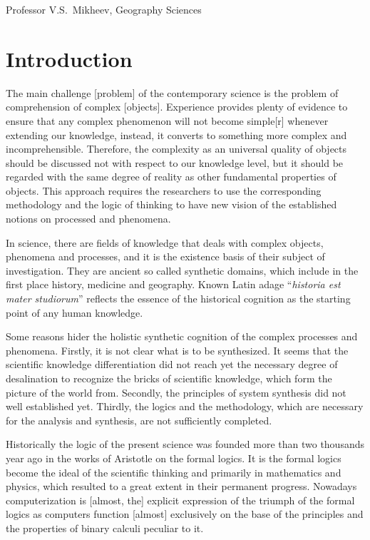 \documentclass[12pt,leqno]{book}
\begin{document}
\vspace{1em}
\noindent{} \hfill{} Professor V.S.~Mikheev, Geography Sciences

\chapter*{Introduction}\normalsize

The main challenge [problem] of the contemporary science is the problem of comprehension of complex [objects]. Experience provides plenty of evidence to ensure that any complex phenomenon will not become simple[r] whenever extending our knowledge, instead, it converts to something more complex and incomprehensible. Therefore, the complexity as an universal quality of objects should be discussed not with respect to our knowledge level, but it should be regarded with the same degree of reality as other fundamental properties of objects. This approach requires the researchers to use the corresponding methodology and the logic of thinking to have new vision of the established notions on processed and phenomena.

In science, there are fields of knowledge that deals with complex objects, phenomena and processes, and it is the existence basis of their subject of investigation. They are ancient so called synthetic domains, which include in the first place history, medicine and geography. Known Latin adage ``\emph{historia est mater studiorum}'' reflects the essence of the historical cognition as the starting point of any human knowledge.

Some reasons hider the holistic synthetic cognition of the complex processes and phenomena. Firstly, it is not clear what is to be synthesized. It seems that the scientific knowledge differentiation did not reach yet the necessary degree of desalination to recognize the bricks of scientific knowledge, which form the picture of the world from. Secondly, the principles of system synthesis did not well established yet. Thirdly, the logics and the methodology, which are necessary for the analysis and synthesis, are not sufficiently completed.

Historically the logic of the present science was founded more than two thousands year ago in the works of Aristotle on the formal logics. It is the formal logics become the ideal of the scientific thinking and primarily in mathematics and physics, which resulted to a great extent in their permanent progress. Nowadays computerization is [almost, the] explicit expression of the triumph of the formal logics as computers function [almost] exclusively on the base of the principles and the properties of binary calculi peculiar to it.
\end{document}
